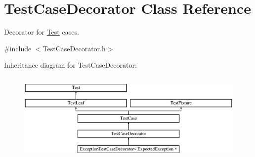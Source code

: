\hypertarget{class_test_case_decorator}{}\section{Test\+Case\+Decorator Class Reference}
\label{class_test_case_decorator}


Decorator for \hyperlink{class_test}{Test} cases.  




{\ttfamily \#include $<$Test\+Case\+Decorator.\+h$>$}

Inheritance diagram for Test\+Case\+Decorator\+:\begin{figure}[H]
\begin{center}
\leavevmode
\includegraphics[height=4.444445cm]{class_test_case_decorator}
\end{center}
\end{figure}
